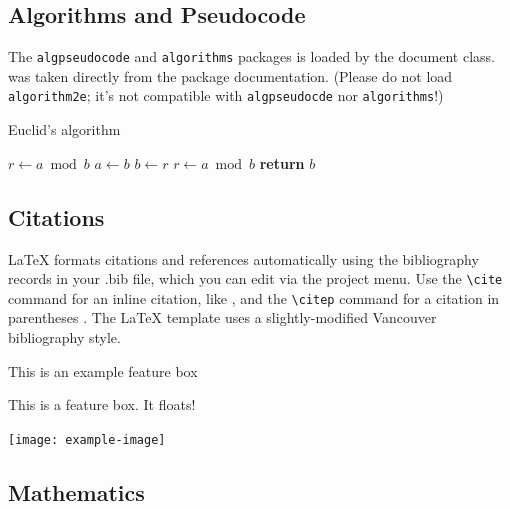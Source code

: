 \documentclass[9pt,bestpractices]{livecoms}
\begin{document}
\subsection{Algorithms and Pseudocode}

The \texttt{algpseudocode} and \texttt{algorithms} packages is loaded by the document class.  was taken directly from the package documentation. (Please do not load \texttt{algorithm2e}; it's not compatible with \texttt{algpseudocde} nor \texttt{algorithms}!)

\begin{algorithm}
\caption{Euclid's algorithm}\label{alg:euclid}
\begin{algorithmic}%
   \State $r\gets a\bmod b$
      \State $a\gets b$
      \State $b\gets r$
      \State $r\gets a\bmod b$
   \EndWhile\label{euclidendwhile}
   \State \textbf{return} $b$
\EndProcedure
\end{algorithmic}
\end{algorithm}


\subsection{Citations}

LaTeX formats citations and references automatically using the bibliography records in your .bib file, which you can edit via the project menu. Use the \verb|\cite| command for an inline citation, like \cite{Aivazian917}, and the \verb|\citep| command for a citation in parentheses \citep{Aivazian917}. The LaTeX template uses a slightly-modified Vancouver bibliography style.

\begin{featurebox}
\caption{This is an example feature box}
\label{box:simple}
This is a feature box. It floats!
\medskip

\texttt{[image: example-image]}

\lipsum[1]
\end{featurebox}

\subsection{Mathematics}
\end{document}
